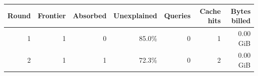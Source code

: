 \begin{tabular}{r r r r r r r}\toprule
\textbf{Round} & \textbf{Frontier} & \textbf{Absorbed} & \textbf{Unexplained} & \textbf{Queries} & \textbf{Cache hits} & \textbf{Bytes billed}\\\midrule
1 & 1 & 0 & 85.0\% & 0 & 1 & 0.00 GiB\\
2 & 1 & 1 & 72.3\% & 0 & 2 & 0.00 GiB\\
\bottomrule\end{tabular}
